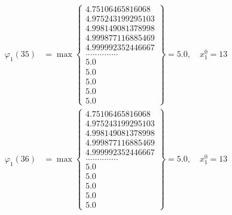 \documentclass{article}
\begin{document}
\begin{align*}
  
  
  
\varphi_{1}(35) &= \max \left\{ \begin{array}{c}
4.75106465816068 \\
 4.975243199295103 \\
 4.998149081378998 \\
 4.999877116885469 \\
 4.999992352446667 \\
 .............. \\
 5.0 \\
 5.0 \\
 5.0 \\
 5.0 \\
 5.0
\end{array} \right\} = 5.0, \quad x_{1}^0 = 13\\
  
  
  
  
\varphi_{1}(36) &= \max \left\{ \begin{array}{c}
4.75106465816068 \\
 4.975243199295103 \\
 4.998149081378998 \\
 4.999877116885469 \\
 4.999992352446667 \\
 .............. \\
 5.0 \\
 5.0 \\
 5.0 \\
 5.0 \\
 5.0
\end{array} \right\} = 5.0, \quad x_{1}^0 = 13\\
  
  
\end{align*}
\end{document}
